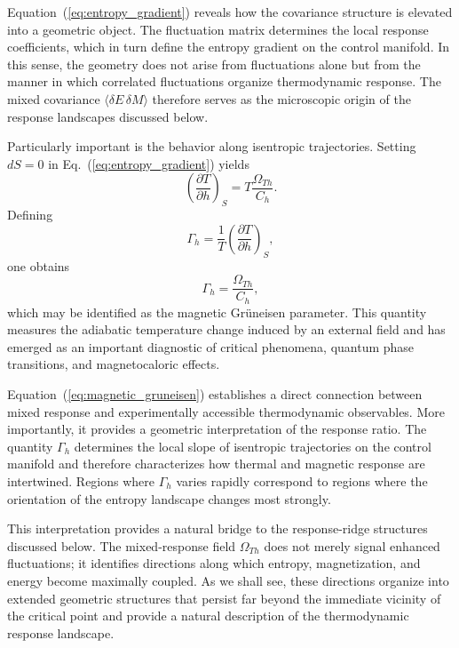 Equation~(\ref{eq:entropy_gradient}) reveals how the covariance
structure is elevated into a geometric object. The fluctuation
matrix determines the local response coefficients, which in turn
define the entropy gradient on the control manifold. In this
sense, the geometry does not arise from fluctuations alone but
from the manner in which correlated fluctuations organize
thermodynamic response. The mixed covariance \(\langle\delta E\,\delta M\rangle\) therefore serves as the
microscopic origin of the response landscapes discussed below.

Particularly important is the behavior along isentropic trajectories.
Setting \(dS=0\) in Eq.~(\ref{eq:entropy_gradient}) yields
\begin{equation}
\left(
\frac{\partial T}{\partial h}
\right)_S
= T \frac{\Omega_{Th}}{C_h}.
\end{equation}
Defining
\begin{equation}
\Gamma_h
=
\frac{1}{T}
\left(
\frac{\partial T}{\partial h}
\right)_S,
\end{equation}
one obtains
\begin{equation}
\Gamma_h
=
\frac{\Omega_{Th}}{C_h},
\label{eq:magnetic_gruneisen}
\end{equation}
which may be identified as the magnetic Gr\"uneisen parameter. This
quantity measures the adiabatic temperature change induced by an
external field and has emerged as an important diagnostic of critical
phenomena, quantum phase transitions, and magnetocaloric effects.

Equation~(\ref{eq:magnetic_gruneisen}) establishes a direct connection
between mixed response and experimentally accessible thermodynamic
observables. More importantly, it provides a geometric interpretation
of the response ratio. The quantity \(\Gamma_h\) determines the local
slope of isentropic trajectories on the control manifold and therefore
characterizes how thermal and magnetic response are intertwined.
Regions where \(\Gamma_h\) varies rapidly correspond to regions where
the orientation of the entropy landscape changes most strongly.

This interpretation provides a natural bridge to the response-ridge
structures discussed below. The mixed-response field
\(\Omega_{Th}\) does not merely signal enhanced fluctuations; it
identifies directions along which entropy, magnetization, and energy
become maximally coupled. As we shall see, these directions organize
into extended geometric structures that persist far beyond the
immediate vicinity of the critical point and provide a natural
description of the thermodynamic response landscape.



